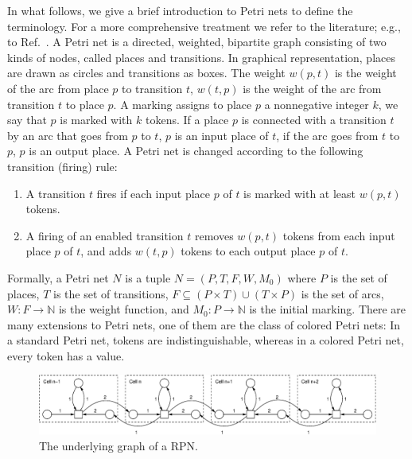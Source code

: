 \documentclass[pre,amssymb,showpacs,showkeys,preprint]{revtex4}
\begin{document}
In what follows, we give a brief introduction to Petri nets to define the terminology.
For a more comprehensive treatment we refer to the literature; e.g., to Ref.~\cite{Murata89}.
A Petri net is a directed, weighted, bipartite graph consisting of two kinds of nodes,
called places and transitions.
In graphical representation, places are drawn as circles and transitions as boxes.
The weight $w(p,t)$ is the weight of the arc from place $p$ to transition $t$,
$w(t,p)$ is the weight of the arc from transition $t$ to place $p$.
A marking assigns to place $p$ a nonnegative integer $k$, we say that $p$ is marked with
$k$ tokens.
If a place $p$ is connected with a transition $t$ by an arc that goes from $p$ to $t$,
$p$ is an input place of $t$, if the arc goes from $t$ to $p$, $p$ is an output place.
A Petri net is changed according to the following transition (firing) rule:
\begin{enumerate}
\item
A transition $t$ fires if each input place $p$ of $t$ is marked with at least
$w(p,t)$ tokens.
\item
A firing of an enabled transition $t$ removes $w(p,t)$ tokens from each input place $p$ of $t$,
and adds $w(t,p)$ tokens to each output place $p$ of $t$.
\end{enumerate}
Formally, a Petri net $N$ is a tuple $N=(P,T,F,W,M_0)$ where
$P$ is the set of places, $T$ is the set of transitions,
$F \subseteq (P \times T) \cup (T \times P)$ is the set of arcs,
$W: F \rightarrow \mathbb{N}$ is the weight function,
and $M_0: P \rightarrow \mathbb{N}$ is the initial marking.
There are many extensions to Petri nets, one of them are the class of colored Petri nets:
In a standard Petri net, tokens are indistinguishable, whereas
in a colored Petri net, every token has a value.

\begin{figure}
\begin{center}
\includegraphics[scale=0.6]{2008-sica-RcaPetri.eps}
\caption{\label{petri} The underlying graph of a RPN.}
\end{center}
\end{figure}
\end{document}
